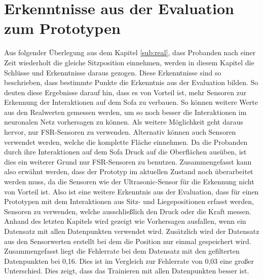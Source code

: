 \section{Erkenntnisse aus der Evaluation zum Prototypen}
Aus folgender Überlegung aus dem Kapitel \ref{sub:real}, dass Probanden nach einer Zeit wiederholt die gleiche Sitzposition einnehmen, werden in diesem Kapitel die Schlüsse und Erkenntnisse daraus gezogen. Diese Erkenntnisse sind so beschrieben, dass bestimmte Punkte die Erkenntnis aus der Evaluation bilden.
\newline
So deuten diese Ergebnisse darauf hin, dass es von Vorteil ist, mehr Sensoren zur Erkennung der Interaktionen auf dem Sofa zu verbauen. So können weitere Werte aus den Realwerten gemessen werden, um so noch besser die Interaktionen im neuronalen Netz vorhersagen zu können. Als weitere Möglichkeit geht daraus hervor, nur FSR-Sensoren zu verwenden. Alternativ können auch Sensoren verwendet werden, welche die komplette Fläche einnehmen. Da die Probanden durch ihre Interaktionen auf dem Sofa Druck auf die Oberflächen ausüben, ist dies ein weiterer Grund nur FSR-Sensoren zu benutzen. Zusammengefasst kann also erwähnt werden, dass der Prototyp im aktuellen Zustand noch überarbeitet werden muss, da die Sensoren wie der Ultrasonic-Sensor für die Erkennung nicht von Vorteil ist. Also ist eine weitere Erkenntnis aus der Evaluation, dass für einen Prototypen mit dem Interaktionen aus Sitz- und Liegepositionen erfasst werden, Sensoren zu verwenden, welche ausschließlich den Druck oder die Kraft messen.
\newpage
Anhand des letzten Kapitels wird gezeigt wie Vorhersagen ausfallen, wenn ein Datensatz mit allen Datenpunkten verwendet wird. Zusätzlich wird der Datensatz aus den Sensorwerten erstellt bei dem die Position nur einmal gespeichert wird. Zusammengefasst liegt die Fehlerrate bei dem Datensatz mit den gefilterten Datenpunkten bei 0,16. Dies ist im Vergleich zur Fehlerrate von 0,03 eine großer Unterschied. Dies zeigt, dass das Trainieren mit allen Datenpunkten besser ist. 


